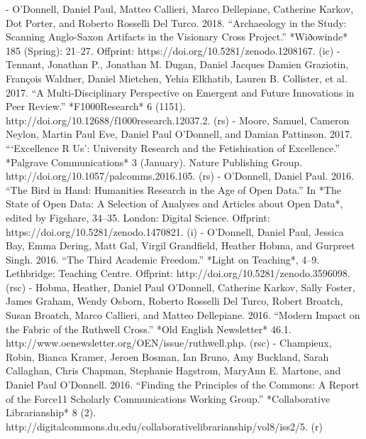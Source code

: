 - O’Donnell, Daniel Paul, Matteo Callieri, Marco Dellepiane, Catherine Karkov, Dot Porter, and Roberto Rosselli Del Turco. 2018. “Archaeology in the Study: Scanning Anglo-Saxon Artifacts in the Visionary Cross Project.” *Wiðowinde* 185 (Spring): 21–27. Offprint: https:/\allowbreak{}/\allowbreak{}doi.org/\allowbreak{}10.5281/\allowbreak{}zenodo.1208167. (ic)
- Tennant, Jonathan P., Jonathan M. Dugan, Daniel Jacques Damien Graziotin, François Waldner, Daniel Mietchen, Yehia Elkhatib, Lauren B. Collister, et al. 2017. “A Multi-Disciplinary Perspective on Emergent and Future Innovations in Peer Review.” *F1000Research* 6 (1151). http:/\allowbreak{}/\allowbreak{}doi.org/\allowbreak{}10.12688/\allowbreak{}f1000research.12037.2. (rs)
- Moore, Samuel\*, Cameron Neylon, Martin Paul Eve, Daniel Paul O’Donnell, and Damian Pattinson. 2017. “‘Excellence R Us’: University Research and the Fetishisation of Excellence.” *Palgrave Communications* 3 (January). Nature Publishing Group. http:/\allowbreak{}/\allowbreak{}doi.org/\allowbreak{}10.1057/\allowbreak{}palcomms.2016.105. (rs)
- O’Donnell, Daniel Paul. 2016. “The Bird in Hand: Humanities Research in the Age of Open Data.” In *The State of Open Data: A Selection of Analyses and Articles about Open Data*, edited by Figshare, 34–35. London: Digital Science. Offprint: https:/\allowbreak{}/\allowbreak{}doi.org/\allowbreak{}10.5281/\allowbreak{}zenodo.1470821. (i)
- O’Donnell, Daniel Paul, Jessica Bay\*, Emma Dering\*, Matt Gal\*, Virgil Grandfield\*, Heather Hobma\*, and Gurpreet Singh\*. 2016. “The Third Academic Freedom.” *Light on Teaching*, 4–9. Lethbridge: Teaching Centre. Offprint: http:/\allowbreak{}/\allowbreak{}doi.org/\allowbreak{}10.5281/\allowbreak{}zenodo.3596098. (rsc)
- Hobma, Heather\*, Daniel Paul O'Donnell, Catherine Karkov, Sally Foster, James Graham, Wendy Osborn, Roberto Rosselli Del Turco, Robert Broatch, Susan Broatch, Marco Callieri, and Matteo Dellepiane. 2016. “Modern Impact on the Fabric of the Ruthwell Cross.” *Old English Newsletter* 46.1. http:/\allowbreak{}/\allowbreak{}www.oenewsletter.org/\allowbreak{}OEN/\allowbreak{}issue/\allowbreak{}ruthwell.php. (rsc)
- Champieux, Robin, Bianca Kramer, Jeroen Bosman, Ian Bruno, Amy Buckland, Sarah Callaghan, Chris Chapman, Stephanie Hagstrom, MaryAnn E. Martone, and Daniel Paul O'Donnell. 2016. “Finding the Principles of the Commons: A Report of the Force11 Scholarly Communications Working Group.” *Collaborative Librarianship* 8 (2). http:/\allowbreak{}/\allowbreak{}digitalcommons.du.edu/\allowbreak{}collaborativelibrarianship/\allowbreak{}vol8/\allowbreak{}iss2/\allowbreak{}5. (r)
